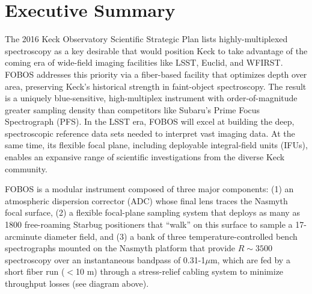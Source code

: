 
\section*{Executive Summary}


The 2016 Keck Observatory Scientific Strategic Plan lists
highly-multiplexed spectroscopy as a key desirable that would
position Keck to take advantage of the coming era of wide-field
imaging facilities like LSST, Euclid, and WFIRST. FOBOS addresses
this priority via a fiber-based facility that optimizes depth over
area, preserving Keck's historical strength in faint-object
spectroscopy. The result is a uniquely blue-sensitive, high-multiplex
instrument with order-of-magnitude greater sampling density than
competitors like Subaru's Prime Focus Spectrograph (PFS). In the LSST
era, FOBOS will excel at building the deep, spectroscopic reference
data sets needed to interpret vast imaging data. At the same time,
its flexible focal plane, including deployable integral-field units
(IFUs), enables an expansive range of scientific investigations from
the diverse Keck community.

FOBOS is a modular instrument composed of three major components: (1)
an atmospheric dispersion corrector (ADC) whose final lens traces the
Nasmyth focal surface, (2) a flexible focal-plane sampling system
that deploys as many as 1800 free-roaming Starbug positioners that
``walk'' on this surface to sample a 17-arcminute diameter field, and
(3) a bank of three temperature-controlled bench spectrographs
mounted on the Nasmyth platform that provide $R \sim 3500$
spectroscopy over an instantaneous bandpass of 0.31-1$\mu$m, which
are fed by a short fiber run ($<$10 m) through a stress-relief
cabling system to minimize throughput losses (see diagram above).

